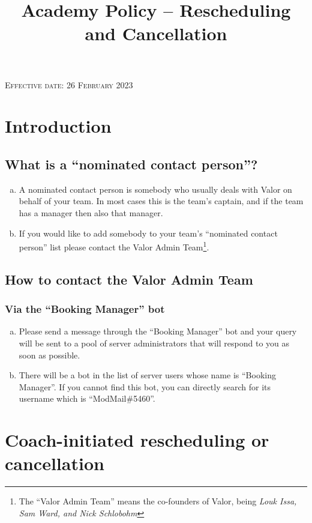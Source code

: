 \documentclass[10pt]{article}
\begin{document}
\title{Academy Policy -- Rescheduling and Cancellation}

\textsc{Effective date: 26 February 2023}


\section{Introduction}
\subsection{What is a ``nominated contact person''?}
\begin{enumerate}[(a)]
\item
A nominated contact person is somebody who usually deals with Valor on behalf of your team. In most cases this is the team's captain, and if the team has a manager then also that manager.

\item
If you would like to add somebody to your team's ``nominated contact person'' list please contact the Valor Admin Team\footnote{The ``Valor Admin Team'' means the co-founders of Valor, being \textit{Louk Issa, Sam Ward, and Nick Schlobohm}}.
\end{enumerate}

\subsection{How to contact the Valor Admin Team}
\subsubsection{Via the ``Booking Manager'' bot}
\begin{enumerate}[(a)]
\item
Please send a message through the ``Booking Manager'' bot and your query will be sent to a pool of server administrators that will respond to you as soon as possible.

\item
There will be a bot in the list of server users whose name is ``Booking Manager''. If you cannot find this bot, you can directly search for its username which is
``ModMail\#5460''.
\end{enumerate}


\section{Coach-initiated rescheduling or cancellation}
\end{document}
